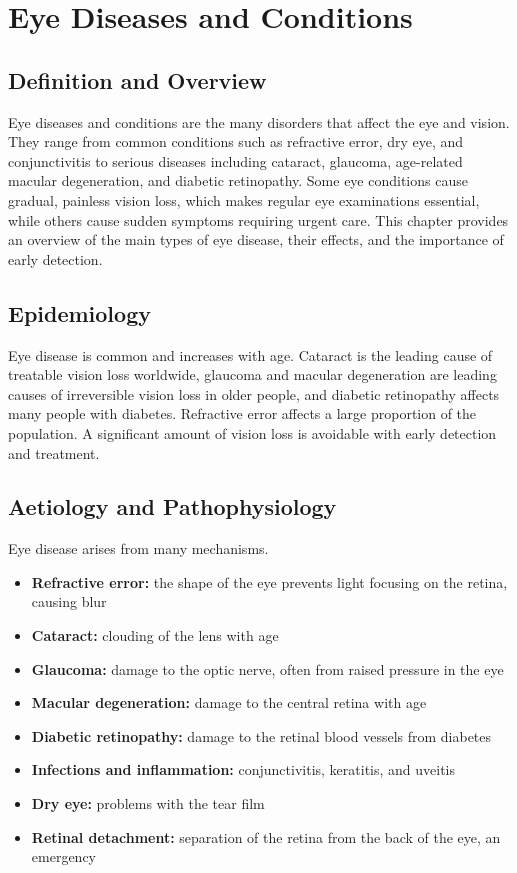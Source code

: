 \chapter{Eye Diseases and Conditions}

\section*{Definition and Overview}
Eye diseases and conditions are the many disorders that affect the eye and vision. They range from common conditions such as refractive error, dry eye, and conjunctivitis to serious diseases including cataract, glaucoma, age-related macular degeneration, and diabetic retinopathy. Some eye conditions cause gradual, painless vision loss, which makes regular eye examinations essential, while others cause sudden symptoms requiring urgent care. This chapter provides an overview of the main types of eye disease, their effects, and the importance of early detection.

\section*{Epidemiology}
Eye disease is common and increases with age. Cataract is the leading cause of treatable vision loss worldwide, glaucoma and macular degeneration are leading causes of irreversible vision loss in older people, and diabetic retinopathy affects many people with diabetes. Refractive error affects a large proportion of the population. A significant amount of vision loss is avoidable with early detection and treatment.

\section*{Aetiology and Pathophysiology}
Eye disease arises from many mechanisms.
\begin{itemize}
    \item \textbf{Refractive error:} the shape of the eye prevents light focusing on the retina, causing blur
    \item \textbf{Cataract:} clouding of the lens with age
    \item \textbf{Glaucoma:} damage to the optic nerve, often from raised pressure in the eye
    \item \textbf{Macular degeneration:} damage to the central retina with age
    \item \textbf{Diabetic retinopathy:} damage to the retinal blood vessels from diabetes
    \item \textbf{Infections and inflammation:} conjunctivitis, keratitis, and uveitis
    \item \textbf{Dry eye:} problems with the tear film
    \item \textbf{Retinal detachment:} separation of the retina from the back of the eye, an emergency
\end{itemize}

